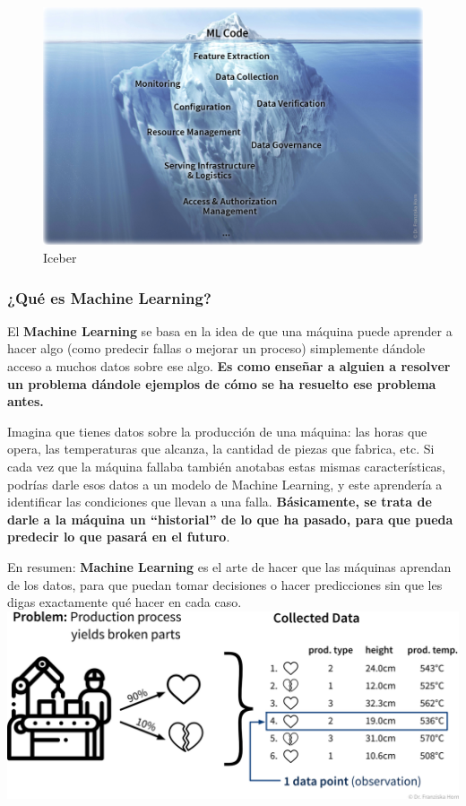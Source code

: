 \documentclass[
  10pt,
  letterpaper,
]{book}
\begin{document}
\begin{figure}[H]

{\centering \includegraphics{Img/imagen_186.jpg}

}

\caption{Iceber}

\end{figure}%

\subsubsection{\texorpdfstring{\textbf{¿Qué es Machine
Learning?}}{¿Qué es Machine Learning?}}\label{quuxe9-es-machine-learning}

El \textbf{Machine Learning} se basa en la idea de que una máquina puede
aprender a hacer algo (como predecir fallas o mejorar un proceso)
simplemente dándole acceso a muchos datos sobre ese algo. \textbf{Es
como enseñar a alguien a resolver un problema dándole ejemplos de cómo
se ha resuelto ese problema antes.}

Imagina que tienes datos sobre la producción de una máquina: las horas
que opera, las temperaturas que alcanza, la cantidad de piezas que
fabrica, etc. Si cada vez que la máquina fallaba también anotabas estas
mismas características, podrías darle esos datos a un modelo de Machine
Learning, y este aprendería a identificar las condiciones que llevan a
una falla. \textbf{Básicamente, se trata de darle a la máquina un
``historial'' de lo que ha pasado, para que pueda predecir lo que pasará
en el futuro}.

En resumen: \textbf{Machine Learning} es el arte de hacer que las
máquinas aprendan de los datos, para que puedan tomar decisiones o hacer
predicciones sin que les digas exactamente qué hacer en cada caso.
\includegraphics{Img/imagen_32.jpg}
\end{document}

